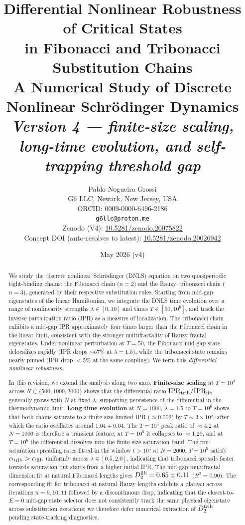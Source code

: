 \documentclass[12pt,a4paper]{article}
\title{\textbf{Differential Nonlinear Robustness of Critical States\\
in Fibonacci and Tribonacci Substitution Chains}\\[0.5em]
\large A Numerical Study of Discrete Nonlinear Schr\"{o}dinger Dynamics\\
\large \emph{Version 4 --- finite-size scaling, long-time evolution, and self-trapping threshold gap}}
\author{Pablo Nogueira Grossi\\
G6 LLC, Newark, New Jersey, USA\\
ORCID: 0009-0000-6496-2186\\
\texttt{g6llc@proton.me}\\[0.3em]
\small Zenodo (V4): \href{https://doi.org/10.5281/zenodo.20075822}{10.5281/zenodo.20075822} \\
\small Concept DOI (auto-resolves to latest): \href{https://doi.org/10.5281/zenodo.20026942}{10.5281/zenodo.20026942}}
\date{May 2026 (v4)}
\begin{document}
\maketitle

\begin{abstract}
We study the discrete nonlinear Schr\"{o}dinger (DNLS) equation on two
quasiperiodic tight-binding chains: the Fibonacci chain ($n=2$) and the
Rauzy--tribonacci chain ($n=3$), generated by their respective substitution
rules. Starting from mid-gap eigenstates of the linear Hamiltonian, we
integrate the DNLS time evolution over a range of nonlinearity strengths
$\lambda \in [0,10]$ and times $T \in [50, 10^6]$, and track the inverse
participation ratio (IPR) as a measure of localization. The tribonacci chain
exhibits a mid-gap IPR approximately four times larger than the Fibonacci
chain in the linear limit, consistent with the stronger multifractality of
Rauzy fractal eigenstates. Under nonlinear perturbation at $T=50$, the
Fibonacci mid-gap state delocalizes rapidly (IPR drops $\sim 57\%$ at
$\lambda=1.5$), while the tribonacci state remains nearly pinned (IPR drop
$<5\%$ at the same coupling). We term this \emph{differential nonlinear
robustness}.

In this revision, we extend the analysis along two axes. \textbf{Finite-size
scaling} at $T=10^4$ across $N \in \{500, 1000, 2000\}$ shows that the
differential ratio $\mathrm{IPR}_{\rm trib}/\mathrm{IPR}_{\rm fib}$
generally grows with $N$ at fixed $\lambda$, supporting persistence of the
differential in the thermodynamic limit. \textbf{Long-time evolution} at
$N=1000$, $\lambda=1.5$ to $T=10^6$ shows that both chains saturate to a
finite-size limited IPR ($\approx 0.002$) by $T \sim 3\times10^5$, after
which the ratio oscillates around $1.04 \pm 0.04$. The $T=10^4$ peak ratio of
$\approx 4.2$ at $N=1000$ is therefore a transient feature; at $T=10^5$ it
collapses to $\approx 1.20$, and at $T=10^6$ the differential dissolves into
the finite-size saturation band. The pre-saturation spreading rates fitted
in the window $t > 10^4$ at $N=2000$, $T=10^5$ satisfy $\alpha_{\rm trib} >
\alpha_{\rm fib}$ uniformly across $\lambda \in [0.5, 2.0]$, indicating that
tribonacci spreads faster towards saturation but starts from a higher initial
IPR. The mid-gap multifractal dimension fit at natural Fibonacci lengths
gives $D_2^{\rm fib} = 0.65 \pm 0.11$ ($R^2 = 0.90$). The corresponding fit
for tribonacci at natural Rauzy lengths exhibits a plateau across iterations
$n=9,10,11$ followed by a discontinuous drop, indicating that the closest-to-
$E=0$ mid-gap state selector does not consistently track the same physical
eigenstate across substitution iterations; we therefore defer numerical
extraction of $D_2^{\rm trib}$ pending state-tracking diagnostics.


\end{abstract}
\end{document}
